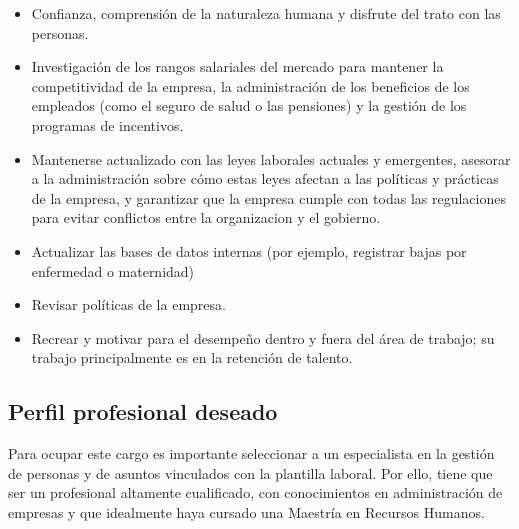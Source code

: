 \documentclass[letterpaper,12pt]{article}
\begin{document}
\begin{sloppypar}
\begin{itemize}
    \item Confianza, comprensión de la naturaleza humana y disfrute del trato con las personas.
    \item Investigación de los rangos salariales del mercado para mantener la competitividad de la empresa, la administración de los beneficios de los empleados (como el seguro de salud o las pensiones) y la gestión de los programas de incentivos.
    \item Mantenerse actualizado con las leyes laborales actuales y emergentes, asesorar a la administración sobre cómo estas leyes afectan a las políticas y prácticas de la empresa, y garantizar que la empresa cumple con todas las regulaciones para evitar conflictos entre la organizacion y el gobierno.
    \item Actualizar las bases de datos internas (por ejemplo, registrar bajas por enfermedad o maternidad)
    \item Revisar políticas de la empresa.
    \item Recrear y motivar para el desempeño dentro y fuera del área de trabajo; su trabajo principalmente es en la retención de talento.
\end{itemize}
\subsection{Perfil profesional deseado}
Para ocupar este cargo es importante seleccionar a un especialista en la gestión de personas y de asuntos vinculados con la plantilla laboral. Por ello, tiene que ser un profesional altamente cualificado, con conocimientos en administración de empresas y que idealmente haya cursado una Maestría en Recursos Humanos.


\end{sloppypar}
\end{document}
